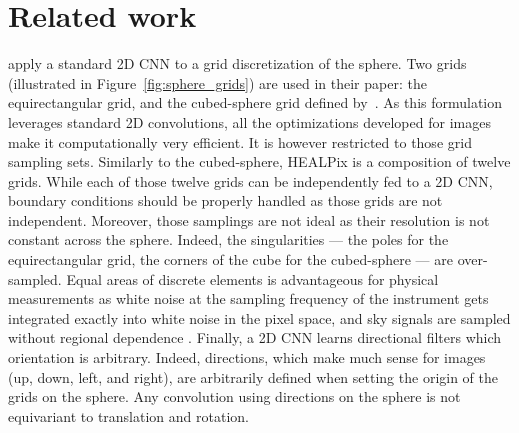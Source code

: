 \documentclass[final,twocolumn,3p,times,authoryear]{elsarticle}
\newcommand{\nati}[1]{{\color[rgb]{.1,.6,.1}{#1}}}
\newcommand{\todo}[1]{{\color[rgb]{.6,.1,.6}{#1}}}
\newcommand{\figref}[1]{Figure~\ref{fig:#1}}
\newcommand{\1}{\b{1}}              %
\newcommand{\0}{\b{0}}              %
\begin{document}
\section{Related work}
\label{sec:related}

\citet{boomsma2017spherical} apply a standard 2D CNN to a grid discretization of the sphere. Two grids (illustrated in \figref{sphere_grids}) are used in their paper: the equirectangular grid, and the cubed-sphere grid defined by~\citet{ronchi1996cubed}.
As this formulation leverages standard 2D convolutions, all the optimizations developed for images make it computationally very efficient. It is however restricted to those grid sampling sets. Similarly to the cubed-sphere, HEALPix is a composition of twelve grids. While each of those twelve grids can be independently fed to a 2D CNN, boundary conditions should be properly handled as those grids are not independent. \todo{How do thy handle boundaries?}
Moreover, those samplings are not ideal as their resolution is not constant across the sphere. Indeed, the singularities --- the poles for the equirectangular grid, the corners of the cube for the cubed-sphere --- are over-sampled. Equal areas of discrete elements is advantageous for physical measurements as white noise at the sampling frequency of the instrument gets integrated exactly into white noise in the pixel space, and sky signals are sampled without regional dependence \citep{gorski2005healpix}.
Finally, a 2D CNN learns directional filters which orientation is arbitrary. Indeed, directions, which make much sense for images (up, down, left, and right), are arbitrarily defined when setting the origin of the grids on the sphere. Any convolution using directions on the sphere is not equivariant to translation and rotation.
\end{document}
